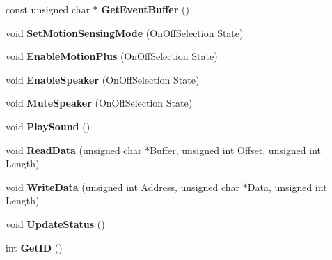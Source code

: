 \begin{DoxyCompactItemize}
\item 
\hypertarget{class_c_wiimote_a42b153de5eda13afd2a94e599bd495bc}{const unsigned char $\ast$ {\bfseries Get\-Event\-Buffer} ()}\label{class_c_wiimote_a42b153de5eda13afd2a94e599bd495bc}

\item 
\hypertarget{class_c_wiimote_a3c8c97c0b796d449e143a1a9147925bc}{void {\bfseries Set\-Motion\-Sensing\-Mode} (On\-Off\-Selection State)}\label{class_c_wiimote_a3c8c97c0b796d449e143a1a9147925bc}

\item 
\hypertarget{class_c_wiimote_ad3e4373c9ab443498f7f6b5cb9c73f20}{void {\bfseries Enable\-Motion\-Plus} (On\-Off\-Selection State)}\label{class_c_wiimote_ad3e4373c9ab443498f7f6b5cb9c73f20}

\item 
\hypertarget{class_c_wiimote_af1a936c6f362670eea3663dd15219bd8}{void {\bfseries Enable\-Speaker} (On\-Off\-Selection State)}\label{class_c_wiimote_af1a936c6f362670eea3663dd15219bd8}

\item 
\hypertarget{class_c_wiimote_aab77d7cd365cea3a7d1e8bdbff07de38}{void {\bfseries Mute\-Speaker} (On\-Off\-Selection State)}\label{class_c_wiimote_aab77d7cd365cea3a7d1e8bdbff07de38}

\item 
\hypertarget{class_c_wiimote_a80afecda83601b7e3b33087500b05c84}{void {\bfseries Play\-Sound} ()}\label{class_c_wiimote_a80afecda83601b7e3b33087500b05c84}

\item 
\hypertarget{class_c_wiimote_a2894de3f305f27ec1f47d896659a8037}{void {\bfseries Read\-Data} (unsigned char $\ast$Buffer, unsigned int Offset, unsigned int Length)}\label{class_c_wiimote_a2894de3f305f27ec1f47d896659a8037}

\item 
\hypertarget{class_c_wiimote_a048e1a9f0612b58b6201ab0f88c7df6c}{void {\bfseries Write\-Data} (unsigned int Address, unsigned char $\ast$Data, unsigned int Length)}\label{class_c_wiimote_a048e1a9f0612b58b6201ab0f88c7df6c}

\item 
\hypertarget{class_c_wiimote_aa175e0730a9e68334c010119a280720d}{void {\bfseries Update\-Status} ()}\label{class_c_wiimote_aa175e0730a9e68334c010119a280720d}

\item 
\hypertarget{class_c_wiimote_aff65f1d90f0fd1a989f0566385276eeb}{int {\bfseries Get\-I\-D} ()}\label{class_c_wiimote_aff65f1d90f0fd1a989f0566385276eeb}


\end{DoxyCompactItemize}
